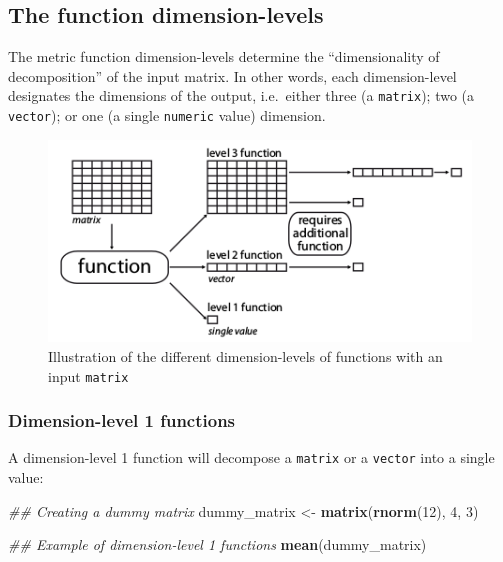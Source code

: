\documentclass[]{book}
\newenvironment{Shaded}{\begin{snugshade}}{\end{snugshade}}
\newcommand{\CommentTok}[1]{\textcolor[rgb]{0.56,0.35,0.01}{\textit{#1}}}
\newcommand{\DecValTok}[1]{\textcolor[rgb]{0.00,0.00,0.81}{#1}}
\newcommand{\KeywordTok}[1]{\textcolor[rgb]{0.13,0.29,0.53}{\textbf{#1}}}
\newcommand{\NormalTok}[1]{#1}
\newcommand{\StringTok}[1]{\textcolor[rgb]{0.31,0.60,0.02}{#1}}
\begin{document}
\hypertarget{the-function-dimension-levels}{%
\subsection{The function dimension-levels}\label{the-function-dimension-levels}}

The metric function dimension-levels determine the ``dimensionality of decomposition'' of the input matrix.
In other words, each dimension-level designates the dimensions of the output, i.e.~either three (a \texttt{matrix}); two (a \texttt{vector}); or one (a single \texttt{numeric} value) dimension.

\begin{figure}
\centering
\includegraphics{dispRity_fun.png}
\caption{Illustration of the different dimension-levels of functions with an input \texttt{matrix}}
\end{figure}

\hypertarget{dimension-level-1-functions}{%
\subsubsection{Dimension-level 1 functions}\label{dimension-level-1-functions}}

A dimension-level 1 function will decompose a \texttt{matrix} or a \texttt{vector} into a single value:

\begin{Shaded}
\begin{Highlighting}[]
\CommentTok{## Creating a dummy matrix}
\NormalTok{dummy_matrix <-}\StringTok{ }\KeywordTok{matrix}\NormalTok{(}\KeywordTok{rnorm}\NormalTok{(}\DecValTok{12}\NormalTok{), }\DecValTok{4}\NormalTok{, }\DecValTok{3}\NormalTok{)}

\CommentTok{## Example of dimension-level 1 functions}
\KeywordTok{mean}\NormalTok{(dummy_matrix)}
\end{Highlighting}
\end{Shaded}
\end{document}
